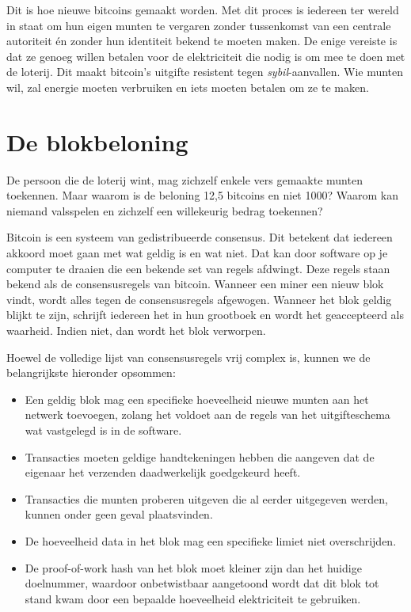 \documentclass[
  letterpaper,
]{scrbook}
\begin{document}
Dit is hoe nieuwe bitcoins gemaakt worden. Met dit proces is iedereen
ter wereld in staat om hun eigen munten te vergaren zonder tussenkomst
van een centrale autoriteit én zonder hun identiteit bekend te moeten
maken. De enige vereiste is dat ze genoeg willen betalen voor de
elektriciteit die nodig is om mee te doen met de loterij. Dit maakt
bitcoin's uitgifte resistent tegen \emph{sybil}-aanvallen. Wie munten
wil, zal energie moeten verbruiken en iets moeten betalen om ze te
maken.

\hypertarget{de-blokbeloning}{%
\section{De blokbeloning}\label{de-blokbeloning}}

De persoon die de loterij wint, mag zichzelf enkele vers gemaakte munten
toekennen. Maar waarom is de beloning 12,5 bitcoins en niet 1000? Waarom
kan niemand valsspelen en zichzelf een willekeurig bedrag toekennen?

Bitcoin is een systeem van gedistribueerde consensus. Dit betekent dat
iedereen akkoord moet gaan met wat geldig is en wat niet. Dat kan door
software op je computer te draaien die een bekende set van regels
afdwingt. Deze regels staan bekend als de consensusregels van bitcoin.
Wanneer een miner een nieuw blok vindt, wordt alles tegen de
consensusregels afgewogen. Wanneer het blok geldig blijkt te zijn,
schrijft iedereen het in hun grootboek en wordt het geaccepteerd als
waarheid. Indien niet, dan wordt het blok verworpen.

Hoewel de volledige lijst van consensusregels vrij complex is, kunnen we
de belangrijkste hieronder opsommen:

\begin{itemize}
\item
  Een geldig blok mag een specifieke hoeveelheid nieuwe munten aan het
  netwerk toevoegen, zolang het voldoet aan de regels van het
  uitgifteschema wat vastgelegd is in de software.
\item
  Transacties moeten geldige handtekeningen hebben die aangeven dat de
  eigenaar het verzenden daadwerkelijk goedgekeurd heeft.
\item
  Transacties die munten proberen uitgeven die al eerder uitgegeven
  werden, kunnen onder geen geval plaatsvinden.
\item
  De hoeveelheid data in het blok mag een specifieke limiet niet
  overschrijden.
\item
  De proof-of-work hash van het blok moet kleiner zijn dan het huidige
  doelnummer, waardoor onbetwistbaar aangetoond wordt dat dit blok tot
  stand kwam door een bepaalde hoeveelheid elektriciteit te gebruiken.
\end{itemize}
\end{document}

